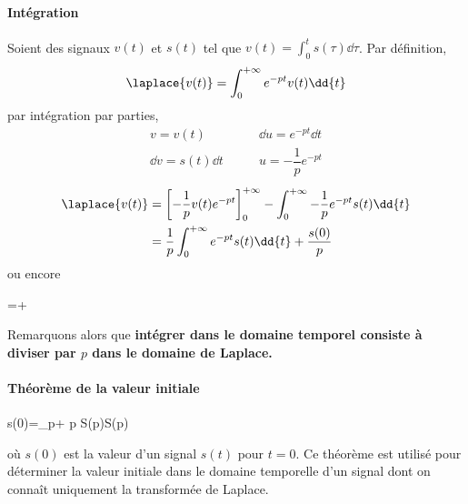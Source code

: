 \paragraph{Intégration}
Soient  des signaux $v(t)$ et $s(t)$ tel que 
$v(t)=\int_{0}^{t}s(\tau)\dd{\tau}$. Par définition,
\[
\laplace{v(t)}=\int_{0}^{+\infty} e^{-pt}v(t)\dd{t}
\]
par intégration par parties,
\begin{align*}
    v=v(t)\qquad&\dd{u}=e^{-pt}\dd{t}\\
    \dd{v}=s(t)\dd{t}\qquad&u=-\dfrac{1}{p}e^{-pt}
\end{align*} 
\begin{align*}
    \laplace{v(t)}&=\left[-\dfrac{1}{p}v(t)e^{-pt}\right]_0^{+\infty}
                          -\int_{0}^{+\infty}
                          -\dfrac{1}{p}e^{-pt}s(t)\dd{t} \\
    &=\dfrac{1}{p}\int_{0}^{+\infty} e^{-pt}s(t)\dd{t}+\dfrac{s(0)}{p}
\end{align*}
ou encore
\begin{bequation}
    =+
\end{bequation}
Remarquons alors que \textbf{intégrer dans le domaine temporel consiste à 
diviser par $p$ dans le domaine de Laplace.}
\paragraph{Théorème de la valeur initiale}
\begin{bequation}
    s(0)=\lim\limits_{p\rightarrow+\infty} p S(p)\qquad \forall S(p)
\end{bequation}
où $s(0)$ est la valeur d'un signal $s(t)$ pour $t=0$.
Ce théorème est utilisé pour déterminer la valeur initiale
dans le domaine temporelle d'un signal dont on connaît 
uniquement la transformée de Laplace.
